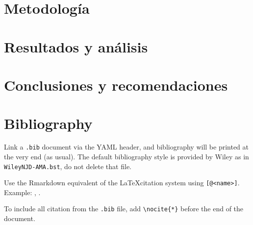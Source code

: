 \documentclass[Royal,times,sageh]{sagej}
\begin{document}
\section{Metodología}\label{metodologuxeda}

\section{Resultados y análisis}\label{resultados-y-anuxe1lisis}

\section{Conclusiones y
recomendaciones}\label{conclusiones-y-recomendaciones}

\section{Bibliography}\label{bibliography}

Link a \texttt{.bib} document via the YAML header, and bibliography will
be printed at the very end (as usual). The default bibliography style is
provided by Wiley as in \texttt{WileyNJD-AMA.bst}, do not delete that
file.

Use the Rmarkdown equivalent of the \LaTeX citation system using
\texttt{{[}@\textless{}name\textgreater{}{]}}. Example:
\citep{Taylor1937}, \citep{Knupp1999, Kamm2000}.

To include all citation from the \texttt{.bib} file, add
\texttt{\textbackslash{}nocite\{*\}} before the end of the document.



\end{document}
